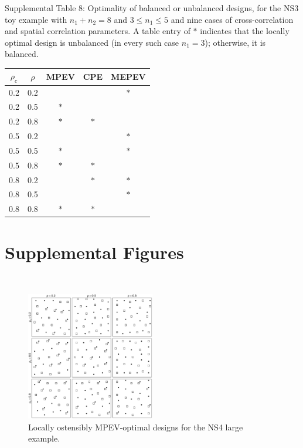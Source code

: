 \documentclass[12pt]{article}
\begin{document}
\newpage
\noindent
Supplemental Table 8: Optimality of balanced or unbalanced designs, for the NS3 toy example with $n_1+n_2=8$ and $3\leq n_1\leq 5$ and nine cases of cross-correlation and spatial correlation parameters.  A table entry of $*$ indicates that the locally optimal design is unbalanced (in every such case $n_1=3$); otherwise, it is balanced.
{\footnotesize
\vspace{.05in}
\begin{center}
\begin{tabular}{|cc|ccc|}
\hline
$\rho_c$ & $\rho$ & MPEV & CPE & MEPEV\\
\hline
0.2 & 0.2 & & & $*$ \\
0.2 & 0.5 & $*$ & & \\
0.2 & 0.8 & $*$ & $*$ & \\
0.5 & 0.2 & & & $*$ \\
0.5 & 0.5 & $*$ & & $*$ \\
0.5 & 0.8 & $*$ & $*$ & \\
0.8 & 0.2 & & $*$ & $*$ \\
0.8 & 0.5 & & & $*$ \\
0.8 & 0.8 & $*$ & $*$ & \\
\hline
\end{tabular}
\end{center}}
\newpage

\section{Supplemental Figures}
\ \vspace{10em}
\renewcommand{\figurename}{Supplemental Figure}
\setcounter{figure}{0}
        \begin{figure}[ht]
        \begin{center}
        \includegraphics[width=0.5\textwidth]{saablup_NS3.pdf}
        \caption{Locally ostensibly MPEV-optimal designs for the NS4 large example.}\label{fig:mpevtoy}
        \end{center}
        \end{figure}
\end{document}
